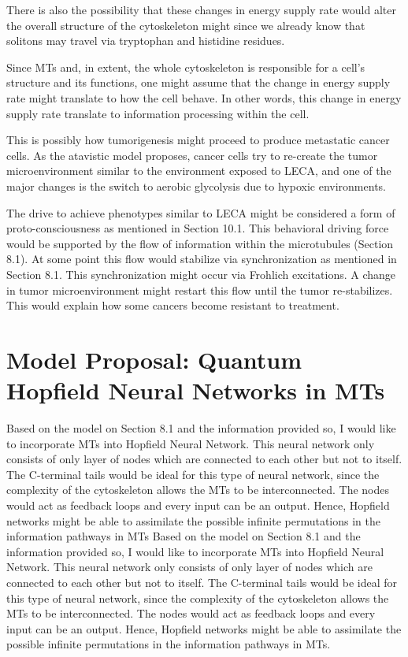 \documentclass[letterpaper,final,times]{cas-dc}
\numberwithin{equation}{section}
\begin{document}
There is also the possibility that these changes in energy supply rate would alter the overall structure of the cytoskeleton might since we already know that solitons may travel via tryptophan and histidine residues.

Since MTs and, in extent, the whole cytoskeleton is responsible for a cell's structure and its functions, one might assume that the change in energy supply rate might translate to how the cell behave. In other words, this change in energy supply rate translate to information processing within the cell.

This is possibly how tumorigenesis might proceed to produce metastatic cancer cells. As the atavistic model proposes, cancer cells try to re-create the tumor microenvironment similar to the environment exposed to LECA, and one of the major changes is the switch to aerobic glycolysis due to hypoxic environments.

The drive to achieve phenotypes similar to LECA might be considered a form of proto-consciousness as mentioned in Section 10.1. This behavioral driving force would be supported by the flow of information within the microtubules (Section 8.1). At some point this flow would stabilize via synchronization as mentioned in Section 8.1. This synchronization might occur via Frohlich excitations. A change in tumor microenvironment might restart this flow until the tumor re-stabilizes. This would explain how some cancers become resistant to treatment.

\section{Model Proposal: Quantum Hopfield Neural Networks in MTs}\noindent
Based on the model on Section 8.1 and the information provided so, I would like to incorporate MTs into Hopfield Neural
Network. This neural network only consists of only layer of nodes which are connected to each other but not to itself. The C-terminal tails would be ideal for this type of neural network, since the complexity of the cytoskeleton allows the MTs to be interconnected. The nodes would act as feedback loops and every input can be an output. Hence, Hopfield networks might be
able to assimilate the possible infinite permutations in the information pathways in MTs Based on the model on Section 8.1 and the information provided so, I would like to incorporate MTs into Hopfield Neural Network. This neural network only consists of only layer of nodes which are connected to each other but not to itself. The C-terminal tails would be ideal for this type of neural network, since the complexity of the cytoskeleton allows the MTs to be interconnected. The nodes would act as feedback loops and every input can be an output. Hence, Hopfield networks might be able to assimilate the possible infinite permutations in the information pathways in MTs.
\end{document}
